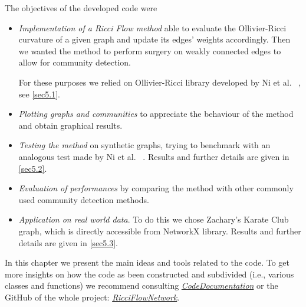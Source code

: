 The objectives of the developed code were
\begin{itemize}
    \item \emph{Implementation of a Ricci Flow method} able to evaluate the Ollivier-Ricci curvature of a given graph and update its edges' weights accordingly. Then we wanted the method to perform surgery on weakly connected edges to allow for community detection.
    
    For these purposes we relied on Ollivier-Ricci library developed by Ni et al. ~\cite{Ollivier-RicciLib}, see \autoref{sec5.1}.
    
    \item \emph{Plotting graphs and communities} to appreciate the behaviour of the method and obtain graphical results.
    
    \item \emph{Testing the method} on synthetic graphs, trying to benchmark with an analogous test made by Ni et al. ~\cite{Ni:communitydetectionnetworksricci}. Results and further details are given in \autoref{sec5.2}.
    
    \item \emph{Evaluation of performances} by comparing the method with other commonly used community detection methods.  
    
    \item \emph{Application on real world data}. To do this we chose Zachary's Karate Club graph, which is directly accessible from NetworkX library. Results and further details are given in \autoref{sec5.3}.
    
\end{itemize}

In this chapter we present the main ideas and tools related to the code. To get more insights on how the code as been constructed and subdivided (i.e., various classes and functions) we recommend consulting \textit{\href{https://fancy-dodol-4d2c6d.netlify.app/}{CodeDocumentation}} or the GitHub of the whole project: \textit{\href{https://github.com/fabbri-lorenzo/RicciFlowNetwork}{RicciFlowNetwork}}.